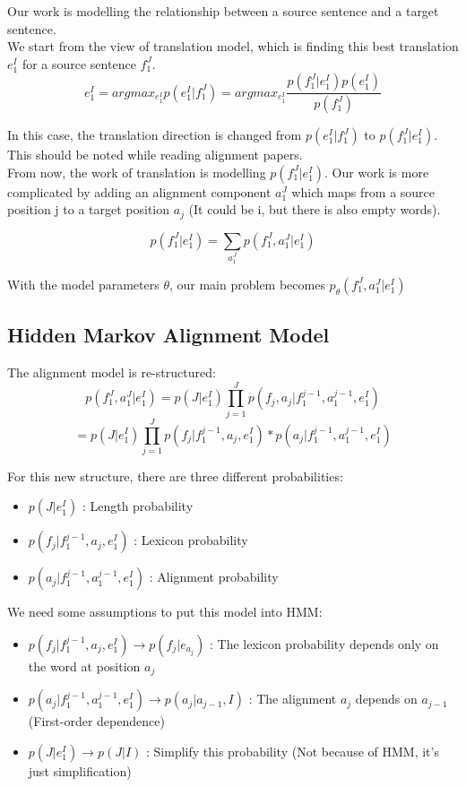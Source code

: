 \documentclass{article}
\begin{document}
Our work is modelling the relationship between a source sentence and a target sentence. \\
We start from the view of translation model, which is finding this best translation $e_1^I$ for a source sentence $f_1^J$.
\begin{equation}
e_1^I = argmax_{e_1^I} p(e_1^I|f_1^J) = argmax_{e_1^I} \frac{p(f_1^J|e_1^I)p(e_1^I)}{p(f_1^J)}
\end{equation}

In this case, the translation direction is changed from $p(e_1^I|f_1^J)$ to $p(f_1^J|e_1^I)$. This should be noted while reading alignment papers. \\

From now, the work of translation is modelling $p(f_1^J|e_1^I)$. Our work is more complicated by adding an alignment component $a_1^J$ which maps from a source position j to a target position $a_j$ (It could be i, but there is also empty words).

\begin{equation}
p(f_1^J|e_1^I) = \sum_{a_1^J} p(f_1^J, a_1^J|e_1^I)
\end{equation}

With the model parameters $\theta$, our main problem becomes $p_{\theta}(f_1^J, a_1^J|e_1^I)$

\subsection{Hidden Markov Alignment Model \cite{Och2003Systematic}}
The alignment model is re-structured:
\begin{equation}
p(f_1^J, a_1^J|e_1^I) = p(J|e_1^I) \prod_{j=1}^J p(f_j, a_j | f_1^{j-1}, a_1^{j-1}, e_1^I)
\end{equation}
\begin{equation}
= p(J|e_1^I) \prod_{j=1}^J p( f_j | f_1^{j-1}, a_j, e_1^I) * p( a_j | f_1^{j-1}, a_1^{j-1}, e_1^I)
\end{equation}

For this new structure, there are three different probabilities:
\begin{itemize}
\item $p(J|e_1^I)$ : Length probability
\item $p( f_j | f_1^{j-1}, a_j, e_1^I)$ : Lexicon  probability
\item $p( a_j | f_1^{j-1}, a_1^{j-1}, e_1^I)$ : Alignment probability
\end{itemize}

We need some assumptions to put this model into HMM:
\begin{itemize}
\item $p( f_j | f_1^{j-1}, a_j, e_1^I) \rightarrow p(f_j | e_{a_j}) $ : The lexicon probability depends only on the word at position $a_j$
\item $p( a_j | f_1^{j-1}, a_1^{j-1}, e_1^I) \rightarrow p(a_j | a_{j-1}, I) $ : The alignment $a_j$ depends on $a_{j - 1}$  (First-order dependence)
\item $p(J|e_1^I) \rightarrow p(J|I)$ : Simplify this probability (Not because of HMM, it's just simplification)
\end{itemize}
\end{document}
